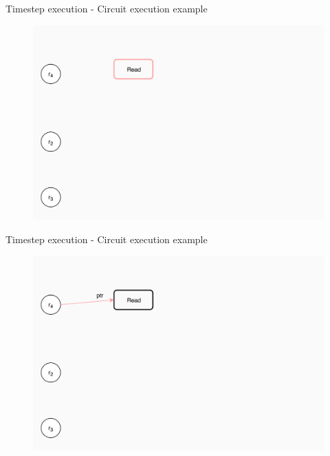 \documentclass[xcolor={usenames}]{beamer}
\begin{document}
  \begin{frame}{Timestep execution - Circuit execution example}
  	\begin{figure}
  		\centering
  		\includegraphics[width=\textwidth]{../figures/example-circuit-1.png}
  	\end{figure}
  \end{frame}
  \begin{frame}{Timestep execution - Circuit execution example}
  	\begin{figure}
  		\centering
  		\includegraphics[width=\textwidth]{../figures/example-circuit-2.png}
  	\end{figure}
  \end{frame}
\end{document}
